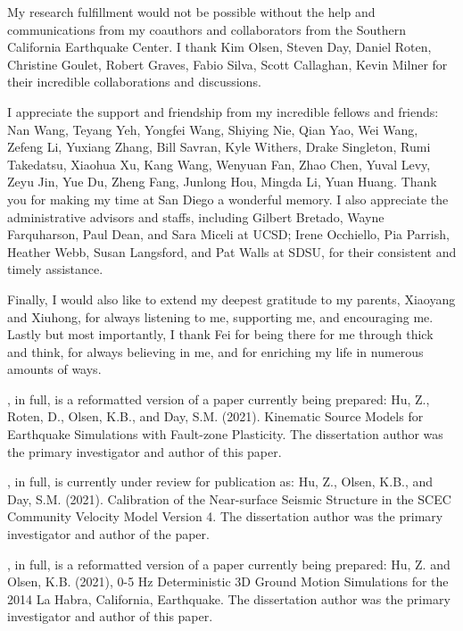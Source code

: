 \begin{frontmatter}
\begin{acknowledgements}
        My research fulfillment would not be possible without the help and communications from my coauthors and collaborators from the Southern California Earthquake Center. I thank Kim Olsen, Steven Day, Daniel Roten, Christine Goulet, Robert Graves, Fabio Silva, Scott Callaghan, Kevin Milner for their incredible collaborations and discussions.

        I appreciate the support and friendship from my incredible fellows and friends: Nan Wang, Teyang Yeh, Yongfei Wang, Shiying Nie, Qian Yao, Wei Wang, Zefeng Li, Yuxiang Zhang, Bill Savran, Kyle Withers, Drake Singleton, Rumi Takedatsu, Xiaohua Xu, Kang Wang, Wenyuan Fan, Zhao Chen, Yuval Levy, Zeyu Jin, Yue Du, Zheng Fang, Junlong Hou, Mingda Li, Yuan Huang. Thank you for making my time at San Diego a wonderful memory. I also appreciate the administrative advisors and staffs, including Gilbert Bretado, Wayne Farquharson, Paul Dean, and Sara Miceli at UCSD; Irene Occhiello, Pia Parrish, Heather Webb, Susan Langsford, and Pat Walls at SDSU, for their consistent and timely assistance.

        Finally, I would also like to extend my deepest gratitude to my parents, Xiaoyang and Xiuhong, for always listening to me, supporting me, and encouraging me. Lastly but most importantly, I thank Fei for being there for me through thick and think, for always believing in me, and for enriching my life in numerous amounts of ways.

        \bigskip

        , in full, is a reformatted version of a paper currently being prepared: Hu, Z., Roten, D., Olsen, K.B., and Day, S.M. (2021). Kinematic Source Models for Earthquake Simulations with Fault-zone Plasticity. The dissertation author was the primary investigator and author of this paper.

        , in full, is currently under review for publication as: Hu, Z., Olsen, K.B., and Day, S.M. (2021). Calibration of the Near-surface Seismic Structure in the SCEC Community Velocity Model Version 4. The dissertation author was the primary investigator and author of the paper.

        , in full, is a reformatted version of a paper currently being prepared: Hu, Z. and Olsen, K.B. (2021), 0-5 Hz Deterministic 3D Ground Motion Simulations for the 2014 La Habra, California, Earthquake. The dissertation author was the primary investigator and author of this paper.


\end{acknowledgements}
\end{frontmatter}
